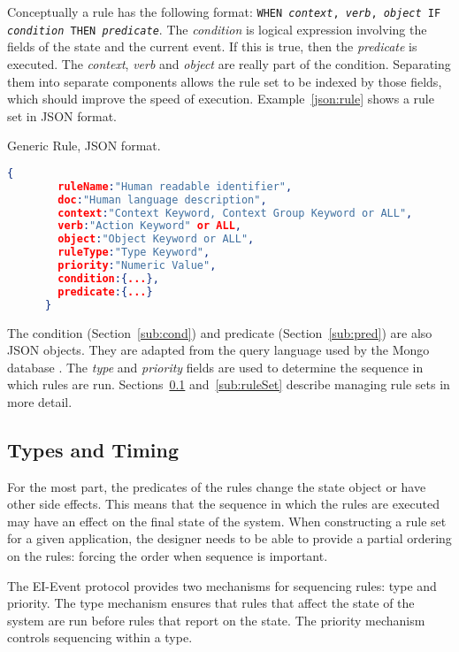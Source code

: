 \documentclass{article}
\begin{document}
  Conceptually a rule has the following format:  \texttt{WHEN
    \textit{context}, \textit{verb}, \textit{object} IF
    \textit{condition} THEN \textit{predicate}}.  The
  \textit{condition} is logical expression involving the fields of the
  state and the current event.  If this is true, then the
  \textit{predicate} is executed.  The \textit{context}, \textit{verb}
  and \textit{object} are really part of the condition.  Separating
  them into separate components allows the rule set to be indexed by
  those fields, which should improve the speed of execution.
  Example~\ref{json:rule} shows a rule set in JSON format.

  \begin{algorithm}
    \caption{Generic Rule, JSON format.}
    \label{json:Rule}
    \begin{lstlisting}[language=json]
      {
        ruleName:"Human readable identifier",
        doc:"Human language description",
        context:"Context Keyword, Context Group Keyword or ALL",
        verb:"Action Keyword" or ALL,
        object:"Object Keyword or ALL",
        ruleType:"Type Keyword",
        priority:"Numeric Value",
        condition:{...},
        predicate:{...}
      }
  \end{lstlisting}
  \end{algorithm}
  
  The condition (Section~\ref{sub:cond}) and predicate
  (Section~\ref{sub:pred}) are also JSON objects.  They are adapted
  from the query language used by the Mongo database \cite{mongo}.
  The \textit{type} and \textit{priority} fields are used to determine
  the sequence in which rules are run.  Sections~\ref{sub:types}
  and~\ref{sub:ruleSet} describe managing rule sets in more detail.

  \subsection{Types and Timing}
  \label{sub:types}

  For the most part, the predicates of the rules change the state
  object or have other side effects.  This means that the sequence in
  which the rules are executed may have an effect on the final state
  of the system.  When constructing a rule set for a given
  application, the designer needs to be able to provide a partial
  ordering on the rules:  forcing the order when sequence is
  important.

  The EI-Event protocol provides two mechanisms for sequencing rules:
  type and priority.  The type mechanism ensures that rules that
  affect the state of the system are run before rules that report on
  the state.  The priority mechanism controls sequencing within a
  type.
\end{document}
